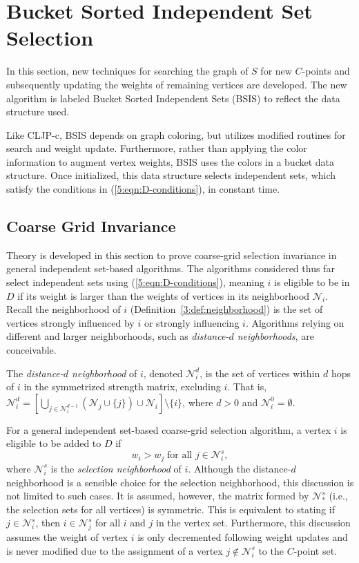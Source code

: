 \documentclass{elsart}
\begin{document}
\section{Bucket Sorted Independent Set Selection}
\label{5:sec:contribution}
In this section, new techniques for searching the graph of $S$ for new
$C$-points and subsequently updating the weights of remaining vertices
are developed. The new algorithm is labeled Bucket Sorted Independent
Sets (BSIS) to reflect the data structure used.

Like CLJP-c, BSIS depends on graph coloring, but utilizes modified
routines for search and weight update. Furthermore, rather than
applying the color information to augment vertex weights, BSIS uses
the colors in a bucket data structure. Once initialized, this data
structure selects independent sets, which satisfy the conditions in
(\ref{5:eqn:D-conditions}), in constant time.

\subsection{Coarse Grid Invariance}
\label{5:sec:cg-invariance}
Theory is developed in this section to prove coarse-grid selection
invariance in general independent set-based algorithms. The algorithms
considered thus far select independent sets using
(\ref{5:eqn:D-conditions}), meaning $i$ is eligible to be in $D$ if
its weight is larger than the weights of vertices in its neighborhood
$\mathcal{N}_i$. Recall the neighborhood of $i$
(Definition~\ref{3:def:neighborhood}) is the set of vertices strongly
influenced by $i$ or strongly influencing $i$. Algorithms relying on
different and larger neighborhoods, such as \emph{distance-$d$
neighborhoods}, are conceivable.
\begin{defn}
The \emph{distance-$d$ neighborhood} of $i$, denoted
$\mathcal{N}_i^d$, is the set of vertices within $d$ hops of $i$ in
the symmetrized strength matrix, excluding $i$. That is,
$\mathcal{N}_i^d = \left[\bigcup_{j \in
\mathcal{N}_i^{d-1}}\left(\mathcal{N}_j \cup \{j\}\right)\cup
\mathcal{N}_i\right] \setminus \{i\}$, where $d > 0$ and
$\mathcal{N}_i^0 = \emptyset$.
\end{defn}

For a general independent set-based coarse-grid selection algorithm, a
vertex $i$ is eligible to be added to $D$ if
\begin{equation}
\label{5:eqn:general-selection}
w_i > w_j\;\textrm{for all } j \in \mathcal{N}_i^s,
\end{equation}
where $\mathcal{N}_i^s$ is the \emph{selection neighborhood} of
$i$. Although the distance-$d$ neighborhood is a sensible choice for
the selection neighborhood, this discussion is not limited to such
cases. It is assumed, however, the matrix formed by $\mathcal{N}_*^s$
(i.e., the selection sets for all vertices) is symmetric. This is
equivalent to stating if $j \in \mathcal{N}_i^s$, then $i \in
\mathcal{N}_j^s$ for all $i$ and $j$ in the vertex set. Furthermore,
this discussion assumes the weight of vertex $i$ is only decremented
following weight updates and is never modified due to the assignment
of a vertex $j \notin \mathcal{N}_i^s$ to the $C$-point set.
\end{document}
